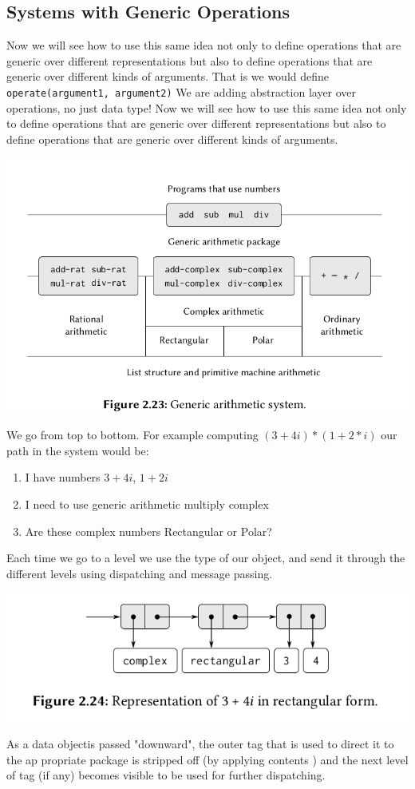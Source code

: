 \documentclass[a4paper,twoside]{article}
\numberwithin{equation}{section}
\begin{document}
\subsection{Systems with Generic Operations}
Now we will see how to use this same idea not only to define operations that are generic over
different representations but also to define operations that are generic
over different kinds of arguments. That is we would define \texttt{operate(argument1, argument2)}
We are adding abstraction layer over operations, no just data type!
Now we will see how to use this same idea not only to define operations that are generic over
different representations but also to define operations that are generic
over different kinds of arguments.
\begin{center}
    \includegraphics[scale = 0.3]{assets/arithmetic_package_system.png}
\end{center}
We go from top to bottom. For example computing $(3 + 4i)*(1 + 2*i)$ our path in the system would be:
\begin{enumerate}
    \item I have numbers $3 + 4i$, $1 + 2i$
    \item I need to use generic arithmetic multiply complex
    \item Are these complex numbers Rectangular or Polar?
\end{enumerate}
Each time we go to a level we use the type of our object, and send it through the different levels
using dispatching and message passing.
\begin{center}
    \includegraphics[scale = 0.3]{assets/repre_complex.png}
\end{center}
As a data objectis passed "downward", the outer tag that is used to direct it to the ap
propriate package is stripped off (by applying contents ) and the next
level of tag (if any) becomes visible to be used for further dispatching.
\end{document}

